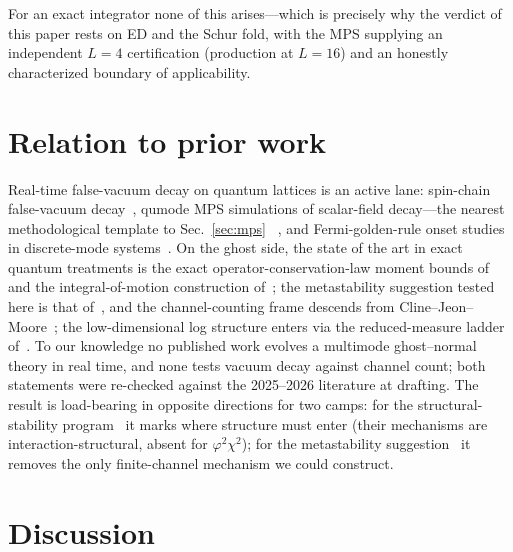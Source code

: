 \documentclass[11pt]{article}
\begin{document}
For an exact integrator none of this arises---which is precisely
why the verdict of this paper rests on ED and the Schur fold,
with the MPS supplying an independent $L=4$ certification (production at $L=16$) and an
honestly characterized boundary of applicability.

\section{Relation to prior work}
\label{sec:prior}

Real-time false-vacuum decay on quantum lattices is an active
lane: spin-chain false-vacuum decay~\cite{Lagnese2021}, qumode
MPS simulations of scalar-field decay---the nearest
methodological template to Sec.~\ref{sec:mps}%
~\cite{AbelSpannowskyWilliams2025}, and Fermi-golden-rule onset
studies in discrete-mode systems~\cite{BurshteinGoldstein2024}.
On the ghost side, the state of the art in exact quantum
treatments is the exact operator-conservation-law moment bounds
of~\cite{EwasiukProfumo2026} and the integral-of-motion
construction of~\cite{Deffayet2026}; the metastability suggestion
tested here is that of~\cite{GSTZ2021}, and the channel-counting
frame descends from Cline--Jeon--Moore~\cite{CJM2004}; the low-dimensional log
structure enters via the reduced-measure ladder of~\cite{instantaneous}. To our knowledge no
published work evolves a multimode ghost--normal theory in real
time, and none tests vacuum decay against channel count; both
statements were re-checked against the 2025--2026 literature at
drafting. The result is
load-bearing in opposite directions for two camps: for the
structural-stability program~\cite{Deffayet2026,EwasiukProfumo2026} it marks where structure must enter (their
mechanisms are interaction-structural, absent for
$\varphi^2\chi^2$); for the metastability
suggestion~\cite{GSTZ2021} it removes the only
finite-channel mechanism we could construct.

\section{Discussion}
\label{sec:discussion}
\end{document}
